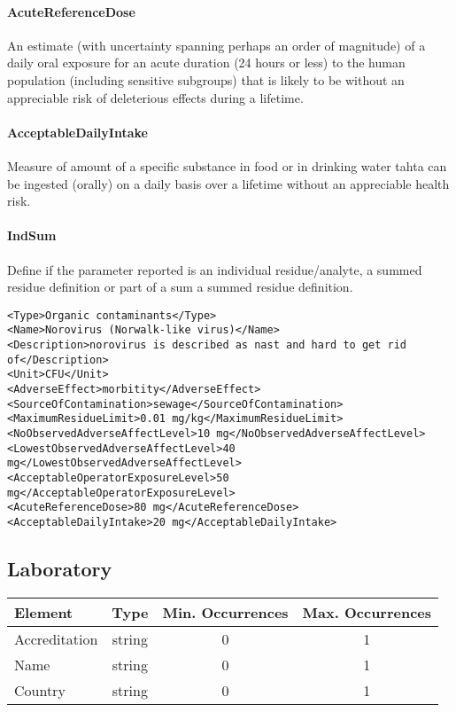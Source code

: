 \documentclass[a4paper]{report}
\begin{document}
\paragraph{AcuteReferenceDose}
An estimate (with uncertainty spanning perhaps an order of magnitude) of a daily oral exposure for an acute duration (24 hours or less) to the human population (including sensitive subgroups) that is likely to be without an appreciable risk of deleterious effects during a lifetime.

\paragraph{AcceptableDailyIntake}
Measure of amount of a specific substance in food or in drinking water tahta can be ingested (orally) on a daily basis over a lifetime without an appreciable health risk.

\paragraph{IndSum}
Define if the parameter reported is an individual residue/analyte, a summed residue definition or part of a sum a summed residue definition.

\begin{lstlisting}[language=RAKIP, caption={Example of Hazard}]
<Type>Organic contaminants</Type>
<Name>Norovirus (Norwalk-like virus)</Name>
<Description>norovirus is described as nast and hard to get rid
of</Description>
<Unit>CFU</Unit>
<AdverseEffect>morbitity</AdverseEffect>
<SourceOfContamination>sewage</SourceOfContamination>
<MaximumResidueLimit>0.01 mg/kg</MaximumResidueLimit>
<NoObservedAdverseAffectLevel>10 mg</NoObservedAdverseAffectLevel>
<LowestObservedAdverseAffectLevel>40 mg</LowestObservedAdverseAffectLevel>
<AcceptableOperatorExposureLevel>50 mg</AcceptableOperatorExposureLevel>
<AcuteReferenceDose>80 mg</AcuteReferenceDose>
<AcceptableDailyIntake>20 mg</AcceptableDailyIntake>
\end{lstlisting}

\subsection{Laboratory}

\begin{tabular}{|l|c|c|c|}
    \hline
    \textbf{Element} & \textbf{Type} & \textbf{Min. Occurrences} & \textbf{Max. Occurrences} \\
    \hline
    Accreditation & string & 0 & 1 \\
    Name & string & 0 & 1 \\
    Country & string & 0 & 1 \\
    \hline
\end{tabular}
\end{document}
